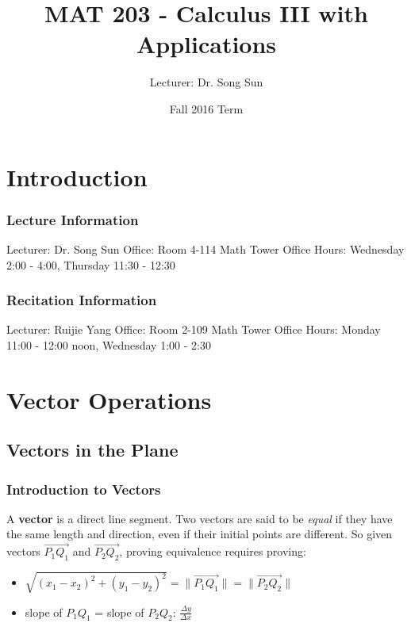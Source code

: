 \documentclass [12 pt, oneside] {book}
\begin{document}
\frontmatter

\title{MAT 203 - Calculus III with Applications}
\author{Lecturer: Dr. Song Sun}
\date{Fall 2016 Term}

\maketitle

\tableofcontents

\chapter{Introduction}

\subsection{Lecture Information}
Lecturer: Dr. Song Sun\newline
Office: Room 4-114 Math Tower\newline
Office Hours: Wednesday 2:00 - 4:00, Thursday 11:30 - 12:30
\subsection{Recitation Information}
Lecturer: Ruijie Yang\newline
Office: Room 2-109 Math Tower\newline
Office Hours: Monday 11:00 - 12:00 noon, Wednesday 1:00 - 2:30

\mainmatter
\chapter{Vector Operations}
\section{Vectors in the Plane}
\subsection{Introduction to Vectors}
A \textbf{vector} is a direct line segment. \newline
Two vectors are said to be \emph{equal} if they have the same length and direction, even if their initial points are different. So  given vectors $\vec{P_1Q_1}$ and $\vec{P_2Q_2}$, proving equivalence requires proving:
\begin{itemize}
\item $\sqrt{(x_1-x_2)^2+(y_1-y_2)^2} = \| \vec{P_1Q_1}\| = \| \vec{P_2Q_2}\|$
\item slope of $P_1Q_1$ = slope of $P_2Q_2$: $\frac{\Delta y}{\Delta x}$
\end{itemize}
\end{document}
